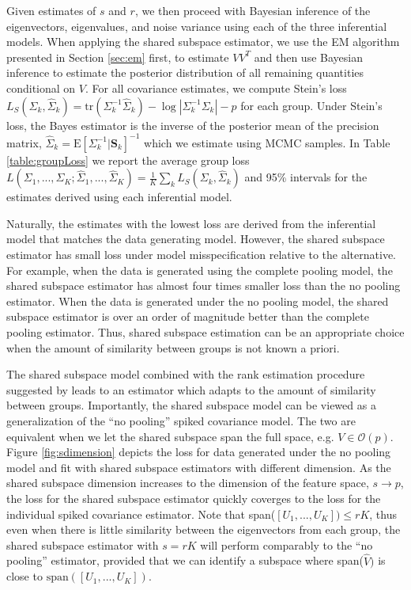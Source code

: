 \documentclass{article}
\newcommand{\bl}[1]{{\mathbf #1}}
\newcommand{\Exp}[1]{{\text{E}}[ \ensuremath{ #1 } ]  }
\begin{document}
Given estimates of $s$ and $r$, we then proceed with Bayesian
inference of the eigenvectors, eigenvalues, and noise variance using
each of the three inferential models.  When applying the shared
subspace estimator, we use the EM algorithm presented in Section
\ref{sec:em} first, to estimate $VV^T$ and then use Bayesian inference
to estimate the posterior distribution of all remaining quantities
conditional on $V$.  For all covariance estimates, we compute Stein's
loss
$L_S( \Sigma_k , \hat\Sigma_k) = \text{tr}( \Sigma_k^{-1} \hat
\Sigma_k ) - \log |\Sigma_k^{-1} \Sigma_k | - p$
for each group.  Under Stein's loss, the Bayes estimator is the
inverse of the posterior mean of the precision matrix,
$\hat \Sigma_{k} = \Exp{ \Sigma_k^{-1} | \bl S_k}^{-1}$ which we
estimate using MCMC samples.  In Table \ref{table:groupLoss} we report
the average group loss
$L(\Sigma_1, ..., \Sigma_K; \hat\Sigma_1, ..., \hat\Sigma_K ) =
\frac{1}{K} \sum_k L_S( \Sigma_k , \hat\Sigma_k)$
and 95\% intervals for the estimates derived using each inferential
model.

Naturally, the estimates with the lowest loss are derived from the
inferential model that matches the data generating model. However, the
shared subspace estimator has small loss under model misspecification
relative to the alternative.  For example, when the data is generated
using the complete pooling model, the shared subspace estimator has
almost four times smaller loss than the no pooling estimator.  When
the data is generated under the no pooling model, the shared subspace
estimator is over an order of magnitude better than the complete
pooling estimator.  Thus, shared subspace estimation can be an
appropriate choice when the amount of similarity between groups is not
known a priori.  

The shared subspace model combined with the rank
estimation procedure suggested by \citet{Gavish2014} leads to an
estimator which adapts to the amount of similarity between groups.
Importantly, the shared subspace model can be viewed as a
generalization of the ``no pooling'' spiked covariance model.  The two
are equivalent when we let the shared subspace span the full space,
e.g. $V \in \mathcal{O}(p)$.  Figure \ref{fig:sdimension} depicts the
loss for data generated under the no pooling model and fit with shared
subspace estimators with different dimension.  As the shared subspace
dimension increases to the dimension of the feature space,
$s \rightarrow p$, the loss for the shared subspace estimator quickly
coverges to the loss for the individual spiked covariance estimator.
Note that span($[U_1, ..., U_K]) \leq rK$, thus even when there is
little similarity between the eigenvectors from each group, the shared
subspace estimator with $s = rK$ will perform comparably to the ``no
pooling'' estimator, provided that we can identify a subspace where
span($\hat{V})$ is close to $\text{span}([U_1, ..., U_K])$.
\end{document}
